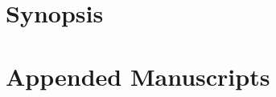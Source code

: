 




\frontmatter %

\pagestyle{pagenum.scrheadings}





%








\mainmatter %

\chapter{Synopsis}
\label{chap:synopsis}



\newpage














\chapter{Appended Manuscripts}

\cleardoublepage

%



\backmatter%




